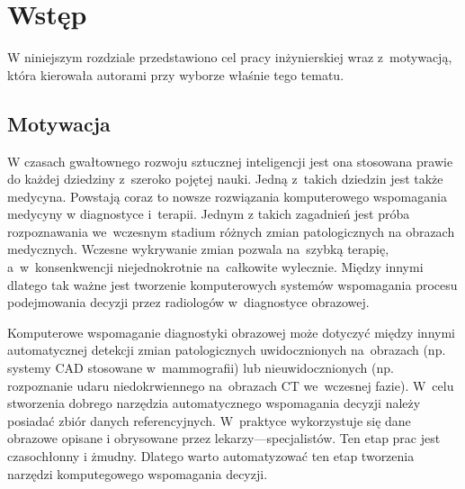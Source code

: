 \documentclass[a4paper,11pt,twoside,openright]{report}
\theoremstyle{definition}
\begin{document}
\thispagestyle{empty}
\newpage

\null\thispagestyle{empty}\newpage


\tableofcontents
\thispagestyle{empty}


\null\thispagestyle{empty}\newpage
\pagestyle{fancy}
\setcounter{page}{11} %

\chapter*{Wstęp}

W niniejszym rozdziale przedstawiono cel pracy inżynierskiej wraz z~motywacją,
która kierowała autorami przy wyborze właśnie tego tematu.

\section*{Motywacja}

W czasach gwałtownego rozwoju sztucznej inteligencji jest ona stosowana prawie
do każdej dziedziny z~szeroko pojętej nauki. Jedną z~takich dziedzin jest także medycyna.
Powstają coraz to nowsze rozwiązania komputerowego wspomagania medycyny w diagnostyce i~terapii.
Jednym z takich zagadnień jest próba rozpoznawania we~wczesnym stadium różnych zmian
patologicznych na obrazach medycznych. Wczesne wykrywanie zmian pozwala
na~szybką terapię, a~w~konsenkwencji niejednokrotnie na~całkowite wylecznie. Między innymi dlatego
tak ważne jest tworzenie komputerowych systemów wspomagania procesu podejmowania
decyzji przez radiologów w~diagnostyce obrazowej.

Komputerowe wspomaganie diagnostyki obrazowej może dotyczyć między innymi automatycznej
detekcji zmian patologicznych uwidocznionych na~obrazach (np. systemy CAD stosowane
w~mammografii) lub nieuwidocznionych (np. rozpoznanie udaru niedokrwiennego na~obrazach %
CT we~wczesnej fazie). W~celu stworzenia dobrego narzędzia automatycznego wspomagania %
decyzji należy posiadać zbiór danych referencyjnych. W~praktyce wykorzystuje się
dane obrazowe opisane i obrysowane przez lekarzy---specjalistów. Ten etap prac
jest czasochłonny i żmudny. Dlatego warto automatyzować ten etap tworzenia narzędzi
komputegowego wspomagania decyzji.
\end{document}

